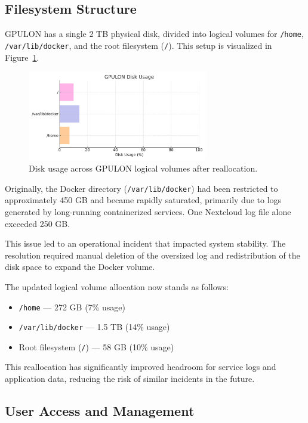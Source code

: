 \subsection{Filesystem Structure}

GPULON has a single 2 TB physical disk, divided into logical volumes for \texttt{/home}, \texttt{/var/lib/docker}, and the root filesystem (\texttt{/}). This setup is visualized in Figure~\ref{fig:gpulon_disk_usage}.

\begin{figure}[H]
  \centering
  \includegraphics[width=0.7\textwidth]{figuras/gpulon_disk_usage.pdf}
  \caption{Disk usage across GPULON logical volumes after reallocation.}
  \label{fig:gpulon_disk_usage}
\end{figure}

Originally, the Docker directory (\texttt{/var/lib/docker}) had been restricted to approximately 450 GB and became rapidly saturated, primarily due to logs generated by long-running containerized services. One Nextcloud log file alone exceeded 250 GB.

This issue led to an operational incident that impacted system stability. The resolution required manual deletion of the oversized log and redistribution of the disk space to expand the Docker volume.

The updated logical volume allocation now stands as follows:

\begin{itemize}
    \item \texttt{/home} — 272 GB (7\% usage)
    \item \texttt{/var/lib/docker} — 1.5 TB (14\% usage)
    \item Root filesystem (\texttt{/}) — 58 GB (10\% usage)
\end{itemize}

This reallocation has significantly improved headroom for service logs and application data, reducing the risk of similar incidents in the future.

\subsection{User Access and Management}

